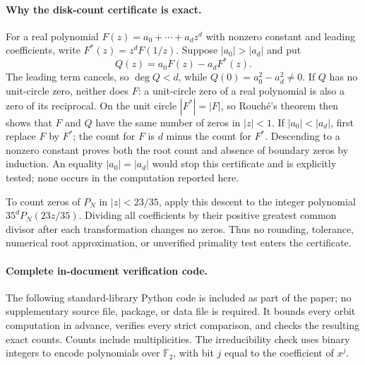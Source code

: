 \documentclass[11pt,a4paper]{article}
\theoremstyle{definition}
\theoremstyle{remark}
\numberwithin{equation}{section}
\begin{document}
\paragraph{Why the disk-count certificate is exact.}
For a real polynomial $F(z)=a_0+\cdots+a_dz^d$ with nonzero constant
and leading coefficients, write
$F^*(z)=z^dF(1/z)$. Suppose $|a_0|>|a_d|$ and put
\[
 Q(z)=a_0F(z)-a_dF^*(z).
\]
The leading term cancels, so $\deg Q<d$, while
$Q(0)=a_0^2-a_d^2\ne0$. If $Q$ has no unit-circle zero, neither does
$F$: a unit-circle zero of a real polynomial is also a zero of its
reciprocal. On the unit circle $|F^*|=|F|$, so Rouch\'e's theorem then
shows that $F$ and $Q$ have the same number of zeros in $|z|<1$.
If $|a_0|<|a_d|$, first replace $F$ by $F^*$; the count for $F$ is
$d$ minus the count for $F^*$. Descending to a nonzero constant proves
both the root count and absence of boundary zeros by induction.
An equality $|a_0|=|a_d|$ would stop this certificate and is explicitly
tested; none occurs in the computation reported here.

To count zeros of $P_N$ in $|z|<23/35$, apply this descent to the
integer polynomial $35^d P_N(23z/35)$. Dividing all coefficients by their
positive greatest common divisor after each transformation changes no
zeros. Thus no rounding, tolerance, numerical root approximation, or
unverified primality test enters the certificate.

\paragraph{Complete in-document verification code.}
The following standard-library Python code is included as part of the
paper; no supplementary source file, package, or data file is required.
It bounds every orbit computation in advance, verifies every strict
comparison, and checks the resulting exact counts. Counts include
multiplicities. The irreducibility check uses binary integers to encode
polynomials over $\mathbb F_2$, with bit $j$ equal to the coefficient of
$x^j$.
\end{document}
